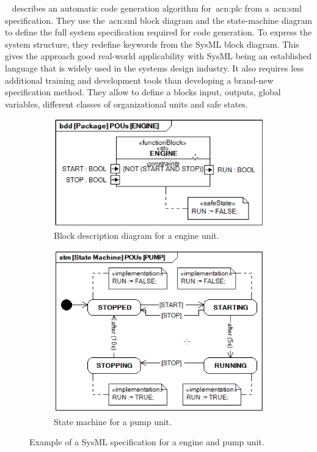 \citeauthor{6957399}~\cite{6957399} describes an automatic code generation algorithm for~\acrshort{acn:plc} from a~\acrshort{acn:sml} specification.
They use the~\acrshort{acn:sml} block diagram and the state-machine diagram to define the full system specification required for code generation.
To express the system structure, they redefine keywords from the SysML block diagram.
This gives the approach good real-world applicability with SysML being an established language that is widely used in the systems design industry.
It also requires less additional training and development tools than developing a brand-new specification method.
They allow to define a blocks input, outputs, global variables, different classes of organizational units and safe states.
\begin{figure}
	\begin{subfigure}{0.5\textwidth}
		\includegraphics[width=\textwidth]{./Figures/sysml_bdd.png}
		\caption{Block description diagram for a engine unit.}
		\label{fig:sysml:bdd}
	\end{subfigure}
	\begin{subfigure}{0.5\textwidth}
		\includegraphics[width=\textwidth]{./Figures/sysml_stm.png}
		\caption{State machine for a pump unit.}
		\label{fig:sysml:stm}
	\end{subfigure}
	\caption[Example of a SysML specification for an engine and pump unit.]{Example of a SysML specification for a engine and pump unit.~\cite{6957399}}
\end{figure}
